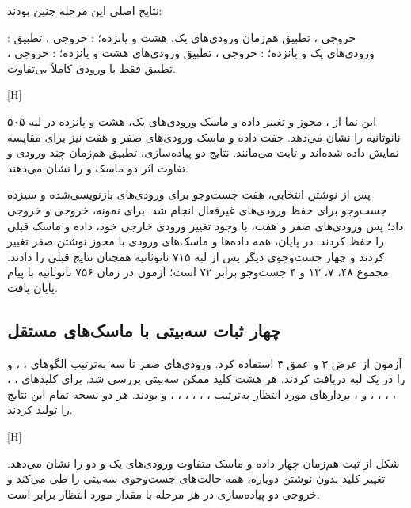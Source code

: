 نتایج اصلی این مرحله چنین بودند:

 : خروجی ، تطبیق هم‌زمان ورودی‌های یک، هشت و پانزده؛
 : خروجی ، تطبیق ورودی‌های یک و پانزده؛
 : خروجی ، تطبیق ورودی‌های هشت و پانزده؛
 : خروجی ، تطبیق فقط با ورودی کاملاً بی‌تفاوت.

[H]

این نما از ، مجوز  و تغییر داده و ماسک ورودی‌های یک، هشت و پانزده در لبه ۵۰۵ نانوثانیه را نشان می‌دهد. جفت داده و ماسک ورودی‌های صفر و هفت نیز برای مقایسه نمایش داده شده‌اند و ثابت می‌مانند. نتایج دو پیاده‌سازی، تطبیق هم‌زمان چند ورودی و تفاوت اثر دو ماسک  و  را نشان می‌دهند.

پس از نوشتن انتخابی، هفت جست‌وجو برای ورودی‌های بازنویسی‌شده و سیزده جست‌وجو برای حفظ ورودی‌های غیرفعال انجام شد. برای نمونه،  خروجی  و  خروجی  داد؛ پس ورودی‌های صفر و هفت، با وجود تغییر ورودی خارجی خود، داده و ماسک قبلی را حفظ کردند. در پایان، همه داده‌ها و ماسک‌های ورودی با مجوز نوشتن صفر تغییر کردند و چهار جست‌وجوی دیگر پس از لبه ۷۱۵ نانوثانیه همچنان نتایج قبلی را دادند. مجموع ۴۸، ۷، ۱۳ و ۴ جست‌وجو برابر ۷۲ است؛ آزمون در زمان ۷۵۶ نانوثانیه با پیام  پایان یافت.

\subsection{چهار ثبات سه‌بیتی با ماسک‌های مستقل}

آزمون  از عرض ۳ و عمق ۴ استفاده کرد. ورودی‌های صفر تا سه به‌ترتیب الگوهای ، ،  و  را در یک لبه دریافت کردند. هر هشت کلید ممکن سه‌بیتی بررسی شد. برای کلیدهای ، ، ، ، ، ،  و ، بردارهای مورد انتظار به‌ترتیب ، ، ، ، ، ،  و  بودند. هر دو نسخه تمام این نتایج را تولید کردند.

[H]

شکل از  ثبت هم‌زمان چهار داده و ماسک متفاوت ورودی‌های یک و دو را نشان می‌دهد. تغییر کلید بدون نوشتن دوباره، همه حالت‌های جست‌وجوی سه‌بیتی را طی می‌کند و خروجی دو پیاده‌سازی در هر مرحله با مقدار مورد انتظار برابر است.

